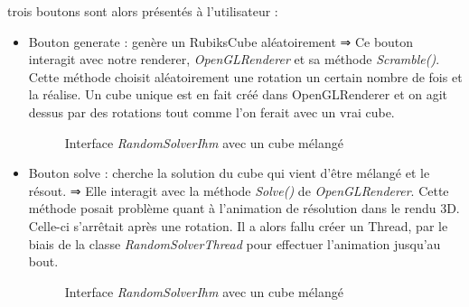 trois boutons sont alors présentés à l'utilisateur :
\begin{itemize}
 	\item Bouton generate : genère un RubiksCube aléatoirement 
	    ⇒ Ce bouton interagit avec notre renderer, \textit{OpenGLRenderer} et sa méthode \textit{Scramble()}. Cette méthode choisit aléatoirement une rotation un certain nombre de fois et la réalise.
Un cube unique est en fait créé dans OpenGLRenderer et on agit dessus par des rotations tout comme l'on ferait avec un vrai cube.

\begin{figure}[h]
\begin{center}
\end{center}
	\caption{Interface  \textit{RandomSolverIhm} avec un cube mélangé}
\end{figure}

	\item Bouton solve : cherche la solution du cube qui vient d'être mélangé et le résout.
	   ⇒  Elle interagit avec la méthode \textit{Solve()} de \textit{OpenGLRenderer}. Cette méthode posait problème quant à l'animation de résolution dans le rendu 3D. Celle-ci s'arrêtait après une rotation. Il a alors
fallu créer un Thread,  par le biais de la classe \textit{RandomSolverThread} pour effectuer l'animation jusqu'au bout.
\begin{figure}[h]
\begin{center}
\end{center}
	\caption{Interface  \textit{RandomSolverIhm} avec un cube mélangé}
\end{figure}


\end{itemize}
